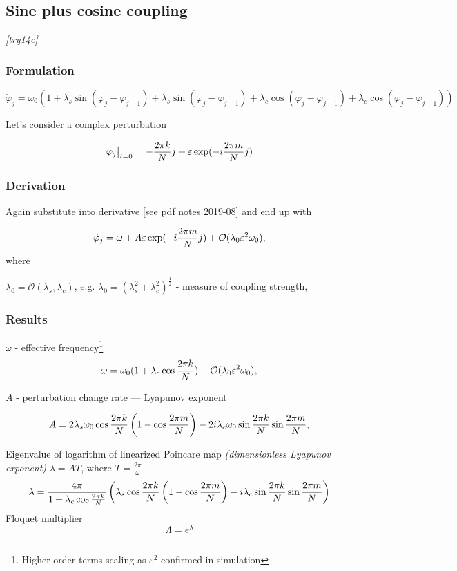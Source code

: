 \documentclass[a4paper,10pt]{article}
\newcommand*{\eps}{\varepsilon}
\newcommand*{\bigO}{\mathcal{O}}
\begin{document}
\clearpage

\subsection{Sine plus cosine coupling}
\textit{[try14c]}

\subsubsection{Formulation}


\begin{equation}
\dot \varphi_j = \omega_0 \left( 
1 
+ \lambda_s \sin(\varphi_j - \varphi_{j-1})
+ \lambda_s \sin(\varphi_j - \varphi_{j+1})
+ \lambda_c \cos(\varphi_j - \varphi_{j-1})
+ \lambda_c \cos(\varphi_j - \varphi_{j+1}) \right)
\label{eqn:dphidt-sin-cos}
\end{equation}

Let's consider a complex perturbation

$$
\varphi_j \big\rvert_{t=0} = - \fr{k}{j} + \eps \exp( - i \fr{m}{j})
$$

\subsubsection{Derivation}

Again substitute into derivative [see pdf notes 2019-08] and end up with

$$
\dot \varphi_j = \omega + A \eps \exp(- i \fr{m}{j}) + \bigO(\lambda_0 \eps ^ 2 \omega_0),
$$
where 

$\lambda_0 = \bigO(\lambda_s, \lambda_c)$, e.g. $\lambda_0 = \left( \lambda_s^2 + \lambda_c^2 \right)^{\frac{1}{2}}$ - measure of coupling strength,


\subsubsection{Results}

$\omega$ - effective frequency\footnote{Higher order terms scaling as $\eps ^2$ confirmed in simulation}
$$
 \omega = \omega_0 (1 + \lambda_c \co{k}{}) + \bigO(\lambda_0 \eps^2 \omega_0 ),
$$

$A$ - perturbation change rate --- Lyapunov exponent

$$ 
A = 
 2 \lambda_s \omega_0 \cos \frac{2 \pi k} {N}  \left(1 - \cos \frac{2 \pi m} {N}  \right)
- 2 i \lambda_c \omega_0 \sin \frac{2 \pi k} {N}  \sin \frac{2 \pi m} {N} ,
$$

Eigenvalue of logarithm of linearized Poincare map \textit{(dimensionless Lyapunov exponent)} $\lambda = A T$, where $T = \frac{2 \pi}{\omega}$
$$
\lambda
=\frac{4 \pi} {1 + \lambda_c \cos \frac{2 \pi k} {N} } \left(  \lambda_s \cos \frac{2 \pi k} {N}  \left(1 - \cos \frac{2 \pi m} {N}  \right)
-  i \lambda_c \sin \frac{2 \pi k} {N}  \sin \frac{2 \pi m} {N}  \right) 
$$
Floquet multiplier
$$ 
\Lambda = e^{\lambda}
$$
\end{document}
